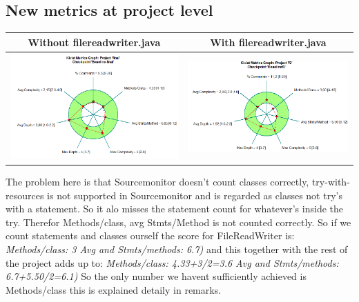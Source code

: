 \documentclass{article}
\begin{document}
\subsection{New metrics at project level} %
\hspace*{-0.5cm}
\begin{tabulary}{0.5\textwidth}{| c | c |}
 \hline
Without filereadwriter.java & With filereadwriter.java \\ \hline
\includegraphics[scale=0.4]{Project-after-with-filereadwriter.png} & \includegraphics[scale=0.4]{Kiviat-project-without-filereadwriter.png} \\ \hline
\end{tabulary}\vspace{0.2cm}

The problem here is that Sourcemonitor doesn't count classes correctly, try-with-resources is not supported in Sourcemonitor and is regarded as classes not try's with a statement. So it alo misses the statement count for whatever's inside the try. Therefor Methods/class, avg Stmts/Method is not counted correctly. So if we count statements and classes ourself the score for FileReadWriter is:
\textit{Methods/class: 3 Avg and Stmts/methods: 6.7)} and this together with the rest of the project adds up to: \textit{Methods/class: 4.33+3/2=3.6 Avg and Stmts/methods: 6.7+5.50/2=6.1)}
So the only number we havent sufficiently achieved is Methods/class this is explained detaily in remarks.
\end{document}
